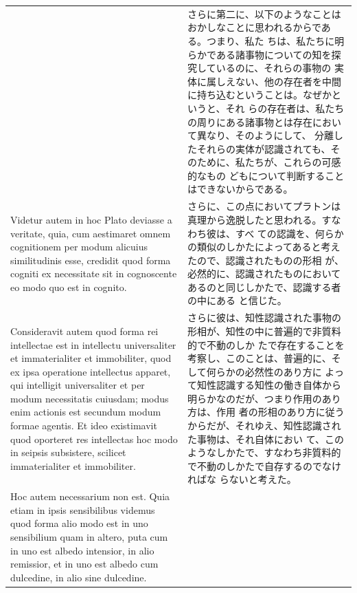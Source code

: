 \documentclass[paper=a4paper,fontsize=10pt,jafontsize=9pt,titlepage]{jlreq}
\begin{document}
\begin{longtable}{p{21em}p{21em}}
 &

 さらに第二に、以下のようなことはおかしなことに思われるからである。つまり、私た
 ちは、私たちに明らかである諸事物についての知を探究しているのに、それらの事物の
 実体に属しえない、他の存在者を中間に持ち込むということは。なぜかというと、それ
 らの存在者は、私たちの周りにある諸事物とは存在において異なり、そのようにして、
 分離したそれらの実体が認識されても、そのために、私たちが、これらの可感的なもの
 どもについて判断することはできないからである。

\\[1em]


 Videtur autem in hoc Plato deviasse a veritate, quia, cum aestimaret omnem
 cognitionem per modum alicuius similitudinis esse, credidit quod forma cogniti
 ex necessitate sit in cognoscente eo modo quo est in cognito.

 &

 さらに、この点においてプラトンは真理から逸脱したと思われる。すなわち彼は、すべ
 ての認識を、何らかの類似のしかたによってあると考えたので、認識されたものの形相
 が、必然的に、認識されたものにおいてあるのと同じしかたで、認識する者の中にある
 と信じた。
 
\\[1em]

 Consideravit autem quod forma rei intellectae est in intellectu
 universaliter et immaterialiter et immobiliter, quod ex ipsa operatione
 intellectus apparet, qui intelligit universaliter et per modum necessitatis
 cuiusdam; modus enim actionis est secundum modum formae agentis. Et ideo
 existimavit quod oporteret res intellectas hoc modo in seipsis subsistere,
 scilicet immaterialiter et immobiliter.


 &

 さらに彼は、知性認識された事物の形相が、知性の中に普遍的で非質料的で不動のしか
 たで存在することを考察し、このことは、普遍的に、そして何らかの必然性のあり方に
 よって知性認識する知性の働き自体から明らかなのだが、つまり作用のあり方は、作用
 者の形相のあり方に従うからだが、それゆえ、知性認識された事物は、それ自体におい
 て、このようなしかたで、すなわち非質料的で不動のしかたで自存するのでなければな
 らないと考えた。
 
\\[1em]

 Hoc autem necessarium non est. Quia
 etiam in ipsis sensibilibus videmus quod forma alio modo est in uno sensibilium
 quam in altero, puta cum in uno est albedo intensior, in alio remissior, et in
 uno est albedo cum dulcedine, in alio sine dulcedine.


\end{longtable}
\end{document}
